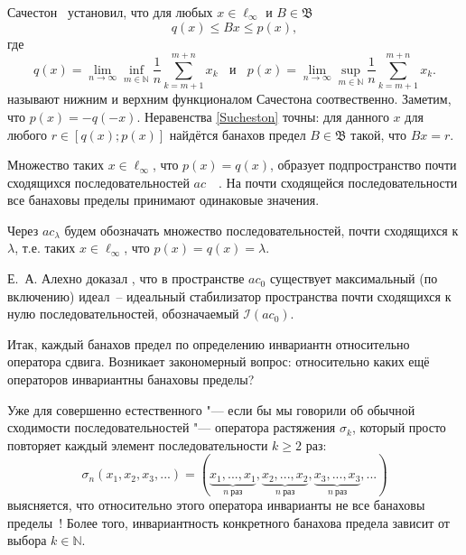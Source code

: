 \documentclass[a4paper,14pt]{article} %
\newcommand{\N}{\ensuremath{\mathbb{N}}}
\theoremstyle{plain}
\begin{document}
	Сачестон~\cite{sucheston1967banach} установил, что
	для любых $x\in \ell_\infty$ и $B\in\mathfrak{B}$
	\begin{equation}\label{Sucheston}
		q(x) \leqslant Bx \leqslant p(x)
		,
	\end{equation}
	где
	\begin{equation*}
		q(x) = \lim_{n\to\infty} \inf_{m\in\mathbb{N}}  \frac{1}{n} \sum_{k=m+1}^{m+n} x_k
		~~~~\mbox{и}~~~~
		p(x) = \lim_{n\to\infty} \sup_{m\in\mathbb{N}}  \frac{1}{n} \sum_{k=m+1}^{m+n} x_k
		.
	\end{equation*}
	называют нижним и верхним функционалом Сачестона соотвественно.
	Заметим, что $p(x) = -q(-x)$.
	Неравенства \eqref{Sucheston} точны:
	для данного $x$ для любого $r\in[q(x); p(x)]$ найдётся банахов предел
	$B\in\mathfrak{B}$ такой, что $Bx = r$.

Множество таких $x\in\ell_\infty$, что $p(x)=q(x)$,
образует подпространство почти сходящихся последовательностей $ac$~~\cite{lorentz1948contribution}.
На почти сходящейся последовательности все банаховы пределы принимают одинаковые значения.

Через $ac_\lambda$ будем обозначать множество последовательностей, почти сходящихся к $\lambda$,
т.е. таких $x\in\ell_\infty$, что $p(x)=q(x)=\lambda$.

	Е.~А. Алехно  доказал \cite{alekhno2012superposition}, что в пространстве $ac_0$
	существует максимальный (по включению) идеал~-- идеальный
	стабилизатор пространства почти сходящихся к нулю последовательностей,
	обозначаемый $\mathcal I(ac_0)$.


Итак, каждый банахов предел по определению инвариантн относительно оператора сдвига.
Возникает закономерный вопрос: относительно каких ещё операторов инвариантны банаховы пределы?


Уже для совершенно естественного "--- если бы мы говорили об обычной сходимости последовательностей "---
оператора растяжения $\sigma_k$, который
просто повторяет каждый элемент последовательности $k\geq 2$ раз:
\begin{equation}
	\sigma_n (x_1, x_2, x_3, ...) = (
		\underbrace{x_1,...,x_1}_{n~\text{раз}},
		\underbrace{x_2,...,x_2}_{n~\text{раз}},
		\underbrace{x_3,...,x_3}_{n~\text{раз}},
		...)
\end{equation}
выясняется, что относительно этого оператора инварианты не все банаховы пределы~\cite{TODO}!
Более того, инвариантность конкретного банахова предела зависит от выбора $k\in\N$.
\end{document}
